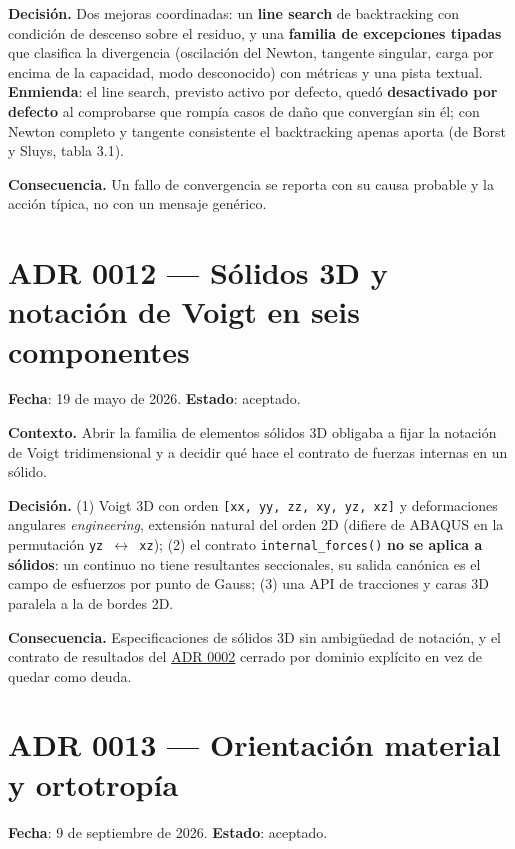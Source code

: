\documentclass[11pt,oneside]{report}
\begin{document}
\textbf{Decisión.} Dos mejoras coordinadas: un \textbf{line search} de backtracking con condición de descenso sobre el residuo, y una \textbf{familia de excepciones tipadas} que clasifica la divergencia (oscilación del Newton, tangente singular, carga por encima de la capacidad, modo desconocido) con métricas y una pista textual. \textbf{Enmienda}: el line search, previsto activo por defecto, quedó \textbf{desactivado por defecto} al comprobarse que rompía casos de daño que convergían sin él; con Newton completo y tangente consistente el backtracking apenas aporta (de Borst y Sluys, tabla 3.1).

\textbf{Consecuencia.} Un fallo de convergencia se reporta con su causa probable y la acción típica, no con un mensaje genérico.

\section{ADR 0012 --- Sólidos 3D y notación de Voigt en seis componentes}
\label{adr:0012}

\textbf{Fecha}: 19 de mayo de 2026. \textbf{Estado}: aceptado.

\textbf{Contexto.} Abrir la familia de elementos sólidos 3D obligaba a fijar la notación de Voigt tridimensional y a decidir qué hace el contrato de fuerzas internas en un sólido.

\textbf{Decisión.} (1) Voigt 3D con orden \texttt{[xx, yy, zz, xy, yz, xz]} y deformaciones angulares \textit{engineering}, extensión natural del orden 2D (difiere de ABAQUS en la permutación \texttt{yz \ensuremath{\leftrightarrow} xz}); (2) el contrato \texttt{internal\_\allowbreak{}forces()} \textbf{no se aplica a sólidos}: un continuo no tiene resultantes seccionales, su salida canónica es el campo de esfuerzos por punto de Gauss; (3) una API de tracciones y caras 3D paralela a la de bordes 2D.

\textbf{Consecuencia.} Especificaciones de sólidos 3D sin ambigüedad de notación, y el contrato de resultados del \hyperref[adr:0002]{ADR 0002} cerrado por dominio explícito en vez de quedar como deuda.

\section{ADR 0013 --- Orientación material y ortotropía}
\label{adr:0013}

\textbf{Fecha}: 9 de septiembre de 2026. \textbf{Estado}: aceptado.
\end{document}
